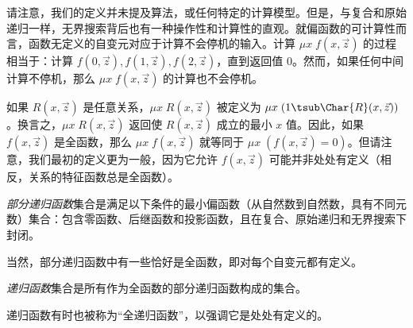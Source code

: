 \documentclass[../../../include/open-logic-section]{subfiles}
\begin{document}
\begin{explain}
请注意，我们的定义并未提及算法，或任何特定的计算模型。但是，与复合和原始递归一样，无界搜索背后也有一种操作性和计算性的直观。就偏函数的可计算性而言，函数无定义的自变元对应于计算不会停机的输入。计算 $\mu x \;
f(x,\vec z)$ 的过程相当于：计算 $f(0,\vec z), f(1,\vec z),
f(2,\vec z)$，直到返回值 0。然而，如果任何中间计算不停机，那么 $\mu x \; f(x,\vec z)$ 的计算也不会停机。
\end{explain}

如果 $R(x,\vec z)$ 是任意关系，$\mu x \; R(x,\vec z)$ 被定义为 $\mu x \; (1 \tsub \Char{R}(x,\vec z))$。换言之，$\mu x \;
R(x,\vec z)$ 返回使 $R(x,\vec z)$ 成立的最小 $x$ 值。因此，如果 $f(x,\vec z)$ 是全函数，那么 $\mu x \; f(x,\vec
z)$ 就等同于 $\mu x \; (f(x,\vec z) = 0)$。但请注意，我们最初的定义更为一般，因为它允许 $f(x,\vec z)$ 可能并非处处有定义（相反，关系的特征函数总是全函数）。

\begin{defn}
\emph{部分递归函数}集合是满足以下条件的最小偏函数（从自然数到自然数，具有不同元数）集合：包含零函数、后继函数和投影函数，且在复合、原始递归和无界搜索下封闭。
\end{defn}

当然，部分递归函数中有一些恰好是全函数，即对每个自变元都有定义。

\begin{defn}
\emph{递归函数}集合是所有作为全函数的部分递归函数构成的集合。
\end{defn}

递归函数有时也被称为“全递归函数”，以强调它是处处有定义的。
\end{document}
